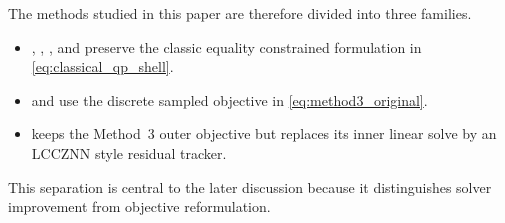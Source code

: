 The methods studied in this paper are therefore divided into three families.
\begin{itemize}[leftmargin=1.5em]
  \item \methodone{}, \methodtwo{}, \methodoneDL{}, and \methodtwoDL{} preserve the classic equality constrained formulation in \eqref{eq:classical_qp_shell}.
  \item \methodthree{} and \methodthreepcg{} use the discrete sampled objective in \eqref{eq:method3_original}.
  \item \methodthreelcc{} keeps the Method~3 outer objective but replaces its inner linear solve by an LCCZNN style residual tracker.
\end{itemize}

This separation is central to the later discussion because it distinguishes solver improvement from objective reformulation.
